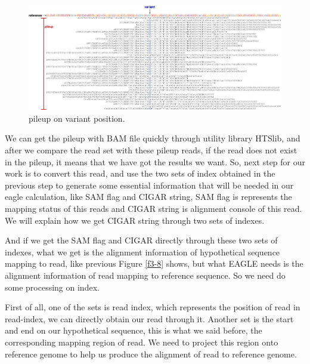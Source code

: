 \vspace{1cm}
\begin{figure}[H]
    \centering
    \includegraphics[width=1\columnwidth]{body/image/3-9.png}
    \captionsetup{labelfont=bf}
    \renewcommand{\baselinestretch}{1.0}
    \vspace{-1cm}
    \caption[pileup]{pileup on variant position.}
    \label{f3-9}
\end{figure}

We can get the pileup with BAM file quickly through utility library HTSlib, and after we compare the read set with these pileup reads, if the read does not exist in the pileup, it means that we have got the results we want. So, next step for our work is to convert this read, and use the two sets of index obtained in the previous step to generate some essential information that will be needed in our eagle calculation, like SAM flag and CIGAR string, SAM flag is represents the mapping status of this reads and CIGAR string is alignment console of this read. We will explain how we get CIGAR string through two sets of indexes.

And if we get the SAM flag and CIGAR directly through these two sets of indexes, what we get is the alignment information of hypothetical sequence mapping to read, like previous Figure \ref{f3-8} shows, but what EAGLE needs is the alignment information of read mapping to reference sequence. So we need do some processing on index.

First of all, one of the sets is read index, which represents the position of read in read-index, we can directly obtain our read through it.	Another set is the start and end on our hypothetical sequence, this is what we said before, the corresponding mapping region of read. We need to project this region onto reference genome to help us produce the alignment of read to reference genome.

